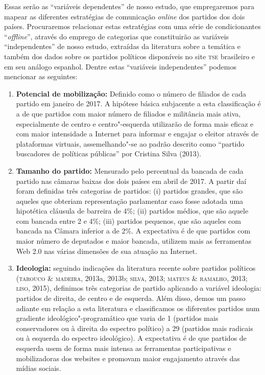 Essas serão as ``variáveis dependentes'' de nosso estudo, que
empregaremos para mapear as diferentes estratégias de comunicação
\emph{online} dos partidos dos dois países. Procuraremos relacionar estas
estratégias com uma série de condicionantes ``\emph{offline}'', através do
emprego de categorias que constituirão as variáveis ``independentes'' de
nosso estudo, extraídas da literatura sobre a temática e também dos
dados sobre os partidos políticos disponíveis no site \textsc{tse} brasileiro e
em seu análogo espanhol. Dentre estas ``variáveis independentes''
podemos mencionar as seguintes:

\begin{enumerate}[label=\scshape\roman*]
\item\textbf{Potencial de mobilização:} Definido como o número de
filiados de cada partido em janeiro de 2017. A hipótese básica
subjacente a esta classificação é a de que partidos com maior número de
filiados e militância mais ativa, especialmente de centro e
centro"-esquerda utilizarão de forma mais eficaz e com maior intensidade
a Internet para informar e engajar o eleitor através de plataformas
virtuais, assemelhando"-se ao padrão descrito como ``partido buscadores
de políticas públicas'' por Cristina Silva (2013).

\item\textbf{Tamanho do partido:} Mensurado pelo percentual da
bancada de cada partido nas câmaras baixas dos dois países em abril de
2017. A partir daí foram definidas três categorias de partidos: (i)
partidos grandes, que são aqueles que obteriam representação parlamentar
caso fosse adotada uma hipotética cláusula de barreira de 4\%; (ii)
partidos médios, que são aquele com bancada entre 2 e 4\%; (iii)
partidos pequenos, que são aqueles com bancada na Câmara inferior a de
2\%. A expectativa é de que partidos com maior número de deputados e
maior bancada, utilizem mais as ferramentas Web 2.0 nas várias dimensões
de sua atuação na Internet.

\item\textbf{Ideologia:} seguindo indicações da literatura
recente sobre partidos políticos (\textsc{tarouco \& madeira}, 2013a, 2013b;
\textsc{silva}, 2013; \textsc{mateus \& ramalho}, 2013; \textsc{liso}, 2015), definimos três
categorias de partido aplicando a variável ideologia: partidos de
direita, de centro e de esquerda. Além disso, demos um passo adiante em
relação a esta literatura e classificamos os diferentes partidos num
gradiente ideológico"-programático que varia de 1 (partidos mais
conservadores ou à direita do espectro político) a 29 (partidos mais
radicais ou à esquerda do espectro ideológico). A expectativa é de que
partidos de esquerda usem de forma mais intensa as ferramentas
participativas e mobilizadoras dos websites e promovam maior engajamento
através das mídias sociais.


\end{enumerate}
